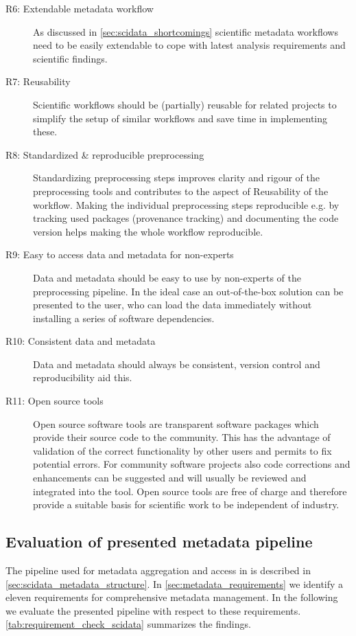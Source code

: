 \begin{description}
 \item[R6: Extendable metadata workflow] As discussed in \cref{sec:scidata_shortcomings} scientific metadata workflows need to be easily extendable to cope with latest analysis requirements and scientific findings.
 \item[R7: Reusability] Scientific workflows should be (partially) reusable for related projects to simplify the setup of similar workflows and save time in implementing these.
 \item[R8: Standardized \& reproducible preprocessing] Standardizing preprocessing steps improves clarity and rigour of the preprocessing tools and contributes to the aspect of Reusability of the workflow. Making the individual preprocessing steps reproducible e.g. by tracking used packages (provenance tracking) and documenting the code version helps making the whole workflow reproducible.
 \item[R9: Easy to access data and metadata for non-experts] Data and metadata should be easy to use by non-experts of the preprocessing pipeline. In the ideal case an out-of-the-box solution can be presented to the user, who can load the data immediately without installing a series of software dependencies. 
 \item[R10: Consistent data and metadata] Data and metadata should always be consistent, version control and reproducibility aid this.
 \item[R11: Open source tools] Open source software tools are transparent software packages which provide their source code to the community. This has the advantage of validation of the correct functionality by other users and permits to fix potential errors. For community software projects also code corrections and enhancements can be suggested and will usually be reviewed and integrated into the tool. Open source tools are free of charge and therefore provide a suitable basis for scientific work to be independent of industry.
\end{description}


\subsection{Evaluation of presented metadata pipeline}
\label{sec:r2gpipeline_evaluation}
The pipeline used for metadata aggregation and access in \citet{Brochier_2018} is described in \cref{sec:scidata_metadata_structure}. In \cref{sec:metadata_requirements} we identify a eleven requirements for comprehensive metadata management. In the following we evaluate the presented pipeline with respect to these requirements. \cref{tab:requirement_check_scidata} summarizes the findings.
\newline

